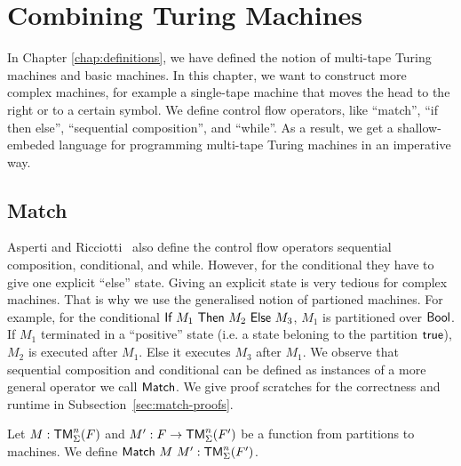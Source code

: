 \chapter{Combining Turing Machines}
\label{chap:combining}

In Chapter \ref{chap:definitions}, we have defined the notion of multi-tape Turing machines and basic machines.  In this chapter, we want to construct
more complex machines, for example a single-tape machine that moves the head to the right or to a certain symbol.
We define control flow operators, like ``match'', ``if then else'', ``sequential composition'', and ``while''.
As a result, we get a shallow-embeded language for programming multi-tape Turing machines in an imperative way.

\section{Match}
\label{sec:match}

Asperti and Ricciotti~\cite{asperti2015} also define the control flow operators sequential composition, conditional, and while.  However, for the
conditional they have to give one explicit ``else'' state.  Giving an explicit state is very tedious for complex machines.  That is why we use the
generalised notion of partioned machines.  For example, for the conditional $\textsf{If}~M_1~\textsf{Then}~M_2~\textsf{Else}~M_3$, $M_1$ is partitioned over $\textsf{Bool}$.  If $M_1$
terminated in a ``positive'' state (i.e. a state beloning to the partition $\textsf{true}$), $M_2$ is executed after $M_1$.  Else it executes $M_3$ after
$M_1$.  We observe that sequential composition and conditional can be defined as instances of a more general operator we call $\textsf{Match}$.  We give
proof scratches for the correctness and runtime in Subsection~\ref{sec:match-proofs}.

Let $M : \textsf{TM}_\Sigma^n(F)$ and $M' : F \rightarrow \textsf{TM}_\Sigma^n(F')$ be a function from partitions to machines.  We define
$\textsf{Match}~M~M' : \textsf{TM}_\Sigma^n(F')$.

